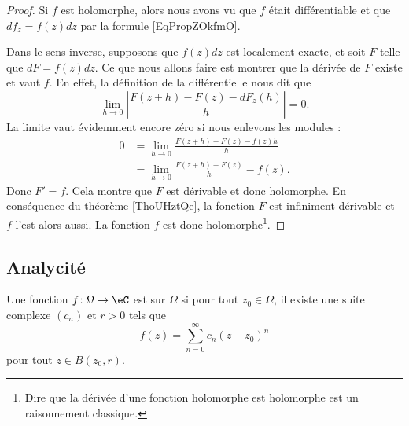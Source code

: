 \begin{proof}
    Si \( f\) est holomorphe, alors nous avons vu que \( f\) était différentiable et que \( df_{z}=f(z)dz\) par la formule \ref{EqPropZOkfmO}.

    Dans le sens inverse, supposons que \( f(z)dz\) est localement exacte, et soit \( F\) telle que \( dF=f(z)dz\). Ce que nous allons faire est montrer que la dérivée de \( F\) existe et vaut \( f\). En effet, la définition de la différentielle nous dit que
    \begin{equation}
        \lim_{h\to 0} \left| \frac{ F(z+h)-F(z)-dF_z(h) }{ h } \right| =0.
    \end{equation}
    La limite vaut évidemment encore zéro si nous enlevons les modules :
    \begin{subequations}
        \begin{align}
            0&=\lim_{h\to 0} \frac{ F(z+h)-F(z)-f(z)h }{ h }\\
            &=\lim_{h\to 0} \frac{ F(z+h)-F(z) }{ h }-f(z).
        \end{align}
    \end{subequations}
    Donc \( F'=f\). Cela montre que \( F\) est dérivable et donc holomorphe. En conséquence du théorème \ref{ThoUHztQe}, la fonction \( F\) est infiniment dérivable et \( f\) l'est alors aussi. La fonction \( f\) est donc holomorphe\footnote{Dire que la dérivée d'une fonction holomorphe est holomorphe est un raisonnement classique.}.
\end{proof}

\subsection{Analycité}

\begin{definition}
    Une fonction \( f\colon \Omega\to \eC\) est  sur \( \Omega\) si pour tout \( z_0\in\Omega\), il existe une suite complexe \( (c_n)\) et \( r>0\) tels que
    \begin{equation}
        f(z)=\sum_{n=0}^{\infty} c_n(z-z_0)^n
    \end{equation}
    pour tout \( z\in B(z_0,r)\).
\end{definition}

